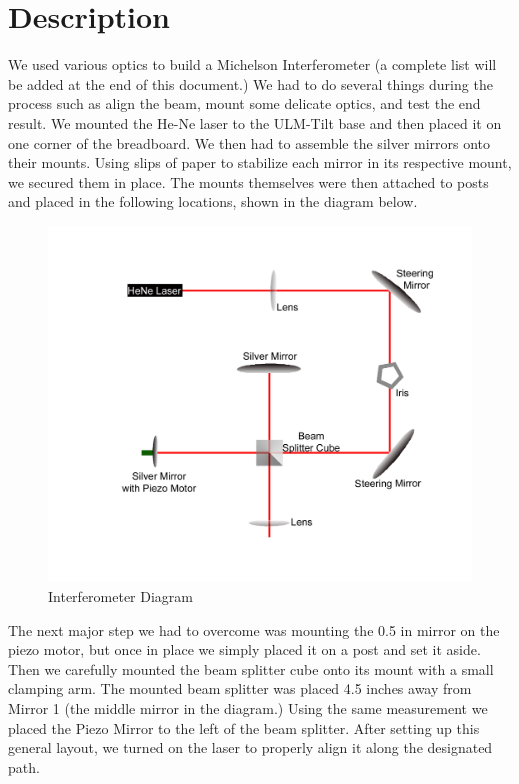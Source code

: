 \section{Description}


We used various optics to build a Michelson Interferometer (a  complete list will be added at the end of this document.) We had to do several things during the process such as align the beam, mount some delicate optics, and test the end result. We mounted the He-Ne laser to the ULM-Tilt base and then placed it on one corner of the breadboard. We then had to assemble the silver mirrors onto their mounts. Using slips of paper to stabilize each mirror in its respective mount, we secured them in place. The mounts themselves were then attached to posts and placed in the following locations, shown in the diagram below.

\begin{figure}[!ht]
\centering
\includegraphics[width=5.5in]{interferometer}
\caption{Interferometer Diagram}
\label{fig:interferometer}
\end{figure}

The next major step we had to overcome was mounting the 0.5 in mirror on the piezo motor, but once in place we simply placed it on a post and set it aside.  Then we carefully mounted the beam splitter cube onto its mount with a small clamping arm. The mounted beam splitter was placed 4.5 inches away from Mirror 1 (the middle mirror in the diagram.) Using the same measurement we placed the Piezo Mirror to the left of the beam splitter.  After setting up this general layout, we turned on the laser to properly align it along the designated path.


